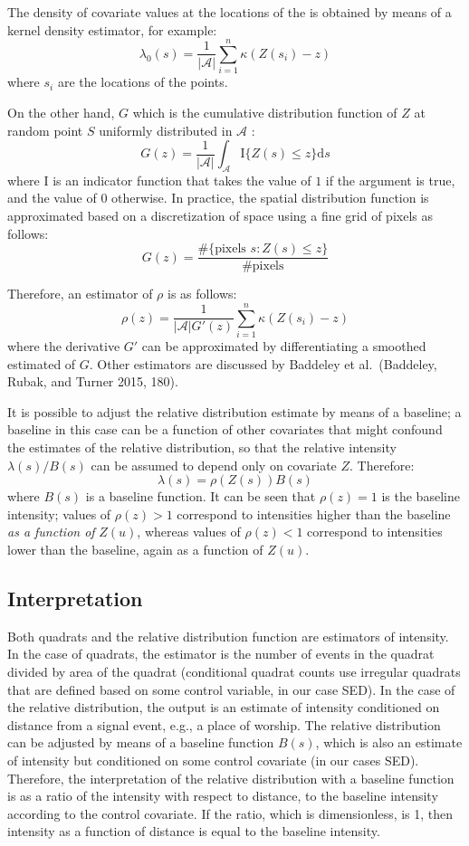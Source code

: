 \documentclass[smallextended]{svjour3}       %
\begin{document}
The density of covariate values at the locations of the is obtained by
means of a kernel density estimator, for example: \[
\lambda_0(s) = \frac{1}{|\mathcal{A}|}\sum_{i = 1}^n\kappa(Z(s_i) - z)
\] where \(s_i\) are the locations of the points.

On the other hand, \(G\) which is the cumulative distribution function
of \(Z\) at random point \(S\) uniformly distributed in \(\mathcal{A}\)
: \[
G(z) = \frac{1}{|\mathcal{A}|} \int_{\mathcal{A}}\text{I}\{Z(s)\leq z\}\text{d}s
\] where \(\text{I}\) is an indicator function that takes the value of
\(1\) if the argument is true, and the value of \(0\) otherwise. In
practice, the spatial distribution function is approximated based on a
discretization of space using a fine grid of pixels as follows: \[
G(z) = \frac{\#\{\text{pixels }s:Z(s)\leq z\}}{\# \text{pixels}}
\]

Therefore, an estimator of \(\rho\) is as follows: \[
\rho(z) = \frac{1}{|\mathcal{A}|G'(z)}\sum_{i=1}^n\kappa(Z(s_i) - z)
\] where the derivative \(G'\) can be approximated by differentiating a
smoothed estimated of \(G\). Other estimators are discussed by Baddeley
et al.~(Baddeley, Rubak, and Turner 2015, 180).

It is possible to adjust the relative distribution estimate by means of
a baseline; a baseline in this case can be a function of other
covariates that might confound the estimates of the relative
distribution, so that the relative intensity \(\lambda(s)/B(s)\) can be
assumed to depend only on covariate \(Z\). Therefore: \[
\lambda(s) = \rho(Z(s))B(s)
\] where \(B(s)\) is a baseline function. It can be seen that
\(\rho(z)=1\) is the baseline intensity; values of \(\rho(z)>1\)
correspond to intensities higher than the baseline \emph{as a function
of} \(Z(u)\), whereas values of \(\rho(z)<1\) correspond to intensities
lower than the baseline, again as a function of \(Z(u)\).

\hypertarget{interpretation}{%
\subsection{Interpretation}\label{interpretation}}

Both quadrats and the relative distribution function are estimators of
intensity. In the case of quadrats, the estimator is the number of
events in the quadrat divided by area of the quadrat (conditional
quadrat counts use irregular quadrats that are defined based on some
control variable, in our case SED). In the case of the relative
distribution, the output is an estimate of intensity conditioned on
distance from a signal event, e.g., a place of worship. The relative
distribution can be adjusted by means of a baseline function \(B(s)\),
which is also an estimate of intensity but conditioned on some control
covariate (in our cases SED). Therefore, the interpretation of the
relative distribution with a baseline function is as a ratio of the
intensity with respect to distance, to the baseline intensity according
to the control covariate. If the ratio, which is dimensionless, is 1,
then intensity as a function of distance is equal to the baseline
intensity.
\end{document}
